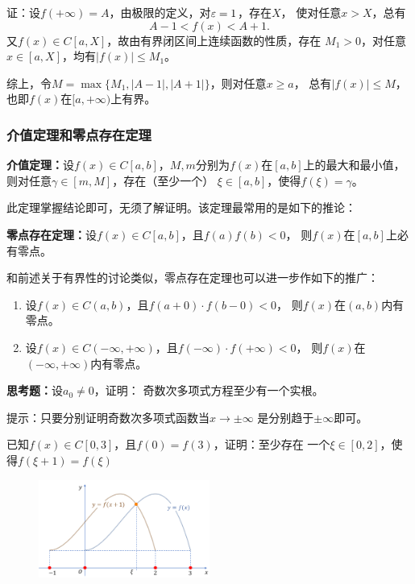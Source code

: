 证：设$f(+\infty)=A$，由极限的定义，对$\varepsilon=1$，存在$X$，
使对任意$x>X$，总有
$$A-1<f(x)<A+1.$$
又$f(x)\in C[a,X]$，故由有界闭区间上连续函数的性质，存在
$M_1>0$，对任意$x\in[a,X]$，均有$|f(x)|\leq M_1$。

综上，令$M=\max\{M_1,|A-1|,|A+1|\}$，则对任意$x\geq a$，
总有$|f(x)|\leq M$，也即$f(x)$在$[a,+\infty)$上有界。
\fin

\subsubsection{介值定理和零点存在定理}

\begin{thx}
	{\bf 介值定理：}设$f(x)\in C[a,b]$，$M,m$分别为$f(x)$在$[a,b]$上的最大和最小值，
	则对任意$\gamma\in[m,M]$，存在（至少一个）
	$\xi\in[a,b]$，使得$f(\xi)=\gamma$。
\end{thx}

此定理掌握结论即可，无须了解证明。该定理最常用的是如下的推论：

\begin{thx}
	{\bf 零点存在定理：}设$f(x)\in C[a,b]$，且$f(a)f(b)<0$，
	则$f(x)$在$[a,b]$上必有零点。
\end{thx}

和前述关于有界性的讨论类似，零点存在定理也可以进一步作如下的推广：
\begin{enumerate}[(1)]
  \setlength{\itemindent}{1cm}
  \item 设$f(x)\in C(a,b)$，且$f(a+0)\cdot f(b-0)<0$，
  则$f(x)$在$(a,b)$内有零点。
  \item 设$f(x)\in C(-\infty,+\infty)$，且$f(-\infty)
  \cdot f(+\infty)<0$，
  则$f(x)$在$(-\infty,+\infty)$内有零点。
\end{enumerate}

\bs
{\bf 思考题：}设$a_0\ne 0$，证明：
奇数次多项式方程至少有一个实根。

\ifhint
提示：只要分别证明奇数次多项式函数当$x\to\pm\infty$
是分别趋于$\pm\infty$即可。
\fi

\bs
\egz 已知$f(x)\in C[0,3]$，且$f(0)=f(3)$，证明：至少存在
一个$\xi\in[0,2]$，使得$f(\xi+1)=f(\xi)$
	
\begin{figure}[h]
	\centering
	\includegraphics[width=0.5\textwidth]{./Images/Ch01/fxx1xi.pdf}
	\caption{}
	\label{fig:fxx1xi}
\end{figure}

